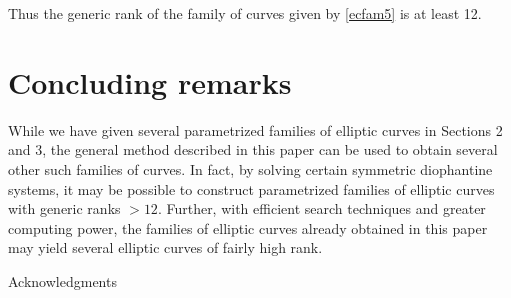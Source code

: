 \documentclass[11pt, leqno]{article}
\begin{document}
Thus the generic rank of the family of curves given by \eqref{ecfam5} is at least 12.

\section{Concluding remarks}
While we have given several parametrized families of elliptic curves in Sections 2 and 3, the general method described in this paper can be used to obtain several other such families of curves.  In fact,  by solving certain symmetric diophantine systems, it may be possible to construct  parametrized families of elliptic curves with generic ranks $> 12$. Further, with efficient search techniques and greater computing power, the families of elliptic curves already obtained in this paper may yield several elliptic curves of fairly high rank. 

\begin{center}
\Large
Acknowledgments
\end{center}
 
\end{document}
